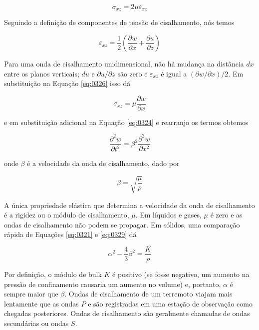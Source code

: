 \documentclass[]{book}
\theoremstyle{definition}
\theoremstyle{definition}
\theoremstyle{definition}
\theoremstyle{remark}
\begin{document}
\begin{equation}
\sigma_{x z}=2 \mu \varepsilon_{x z} \label{eq:0325}
\end{equation}

Seguindo a definição de componentes de tensão de cisalhamento, nós temos

\begin{equation}
\varepsilon_{x z}=\frac{1}{2}\left(\frac{\partial w}{\partial x}+\frac{\partial u}{\partial z}\right) \label{eq:0326}
\end{equation}

Para uma onda de cisalhamento unidimensional, não há mudança na distância \(dx\) entre os planos verticais; \(du\) e \(\partial u / \partial z\) são zero e \(\varepsilon_{x z}\) é igual a \((\partial w / \partial x) / 2\). Em substituição na Equação \eqref{eq:0326} isso dá

\begin{equation}
\sigma_{x z}=\mu \frac{\partial w}{\partial x} \label{eq:0327}
\end{equation}

e em substituição adicional na Equação \eqref{eq:0324} e rearranjo os termos obtemos

\begin{equation}
\frac{\partial^{2} w}{\partial t^{2}}=\beta^{2} \frac{\partial^{2} w}{\partial x^{2}} \label{eq:0328}
\end{equation}

onde \(\beta\) é a velocidade da onda de cisalhamento, dado por

\begin{equation}
\beta=\sqrt{\frac{\mu}{\rho}} \label{eq:0329}
\end{equation}

A única propriedade elástica que determina a velocidade da onda de cisalhamento é a rigidez ou o módulo de cisalhamento, \(\mu\). Em líquidos e gases, \(\mu\) é zero e as ondas de cisalhamento não podem se propagar. Em sólidos, uma comparação rápida de Equações \eqref{eq:0321} e \eqref{eq:0329} dá

\begin{equation}
\alpha^{2}-\frac{4}{3} \beta^{2}=\frac{K}{\rho}  \label{eq:0330}
\end{equation}

Por definição, o módulo de bulk \(K\) é positivo (se fosse negativo, um aumento na pressão de confinamento causaria um aumento no volume) e, portanto, \(\alpha\) é sempre maior que \(\beta\). Ondas de cisalhamento de um terremoto viajam mais lentamente que as ondas \(P\) e são registradas em uma estação de observação como chegadas posteriores. Ondas de cisalhamento são geralmente chamadas de ondas secundárias ou ondas \(S\).
\end{document}
